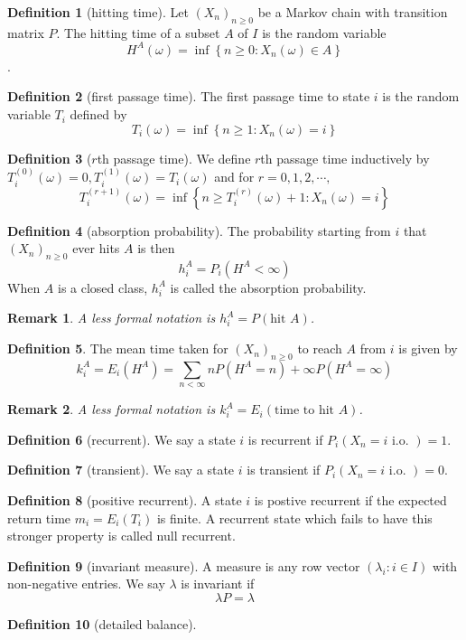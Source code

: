 \documentclass{article}
\newtheorem*{Rk}{Remark}
\theoremstyle{definition}
\newtheorem{Def}{Definition}[section]
\begin{document}
\begin{Def}[hitting time]
    Let $(X_n)_{n\ge 0}$ be a Markov chain with transition matrix $P$. The hitting time of a subset $A$ of $I$ is the random
    variable \[H^A(\omega)=\inf \left\{n\ge 0:X_n(\omega)\in A\right\}\].
\end{Def}
\begin{Def}[first passage time]
    The first passage time to state $i$ is the random variable $T_i$ defined by \[T_i(\omega)=\inf\left\{n\ge 1:X_n(\omega)=i\right\}\]
\end{Def}
\begin{Def}[$r$th passage time]
    We define $r$th passage time inductively by 
    $T_i^{(0)}(\omega)=0,T_i^{(1)}(\omega)=T_i(\omega)$
    and for $r=0,1,2,\cdots,$
    \[T_i^{(r+1)}(\omega)=\inf\left\{n\ge T_i^{(r)}(\omega)+1:X_n(\omega)=i\right\}\]
\end{Def}


\begin{Def}[absorption probability]
    The probability starting from $i$ that $(X_n)_{n\ge 0}$ ever hits $A$ is then \[h_i^A=P_i(H^A<\infty)\]
    When $A$ is a closed class, $h_i^A$ is called the absorption probability.
\end{Def}
\begin{Rk}
A less formal notation is $h_i^A=P(\text{hit }A)$.
\end{Rk}
\begin{Def}
    The mean time taken for $(X_n)_{n\ge 0}$ to reach $A$ from $i$ is given by \[k_i^A=E_i(H^A)=\sum_{n<\infty}nP(H^A=n)+\infty P(H^A=\infty)\]
\end{Def}
\begin{Rk}
    A less formal notation is $k_i^A=E_i(\text{time to hit }A)$.
\end{Rk}


\begin{Def}[recurrent]
    We say a state $i$ is recurrent if $P_i(X_n=i\text{ i.o. })=1$.
\end{Def}
\begin{Def}[transient]
    We say a state $i$ is transient if $P_i(X_n=i\text{ i.o. })=0$.
\end{Def}
\begin{Def}[positive recurrent]
    A state $i$ is postive recurrent if the expected return time $m_i=E_i(T_i)$ is finite.
    A recurrent state which fails to have this stronger property is called null recurrent.
\end{Def}
\begin{Def}[invariant measure]
    A measure is any row vector $(\lambda_i:i\in I)$ with non-negative entries. We say $\lambda$ is invariant if \[\lambda P=\lambda\]
\end{Def}
\begin{Def}[detailed balance]
    
\end{Def}
\end{document}
